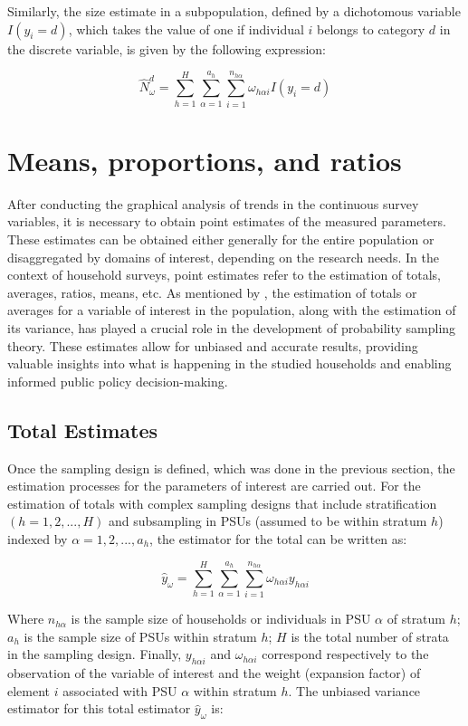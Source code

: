 \documentclass[
  12pt,
]{book}
\begin{document}
Similarly, the size estimate in a subpopulation, defined by a dichotomous variable \(I(y_i = d)\), which takes the value of one if individual \(i\) belongs to category \(d\) in the discrete variable, is given by the following expression:

\[
\hat{N}^d_{\omega} = \sum_{h=1}^{H}\sum_{\alpha=1}^{a_{h}}\sum_{i=1}^{n_{h\alpha}}\omega_{h\alpha i}I(y_i = d)
\]

\hypertarget{means-proportions-and-ratios}{%
\section{Means, proportions, and ratios}\label{means-proportions-and-ratios}}

After conducting the graphical analysis of trends in the continuous survey variables, it is necessary to obtain point estimates of the measured parameters. These estimates can be obtained either generally for the entire population or disaggregated by domains of interest, depending on the research needs. In the context of household surveys, point estimates refer to the estimation of totals, averages, ratios, means, etc. As mentioned by \citet{Heeringa_West_Berglund_2017}, the estimation of totals or averages for a variable of interest in the population, along with the estimation of its variance, has played a crucial role in the development of probability sampling theory. These estimates allow for unbiased and accurate results, providing valuable insights into what is happening in the studied households and enabling informed public policy decision-making.

\hypertarget{total-estimates}{%
\subsection{Total Estimates}\label{total-estimates}}

Once the sampling design is defined, which was done in the previous section, the estimation processes for the parameters of interest are carried out. For the estimation of totals with complex sampling designs that include stratification \(\left(h=1,2,...,H\right)\) and subsampling in PSUs (assumed to be within stratum \(h\)) indexed by \(\alpha=1,2,...,a_{h}\), the estimator for the total can be written as:

\[
\hat{y}_{\omega} = \sum_{h=1}^{H}\sum_{\alpha=1}^{a_{h}}\sum_{i=1}^{n_{h\alpha}}\omega_{h\alpha i}y_{h\alpha i}
\]

Where \(n_{h\alpha}\) is the sample size of households or individuals in PSU \(\alpha\) of stratum \(h\); \(a_{h}\) is the sample size of PSUs within stratum \(h\); \(H\) is the total number of strata in the sampling design. Finally, \(y_{h\alpha i}\) and \(\omega_{h\alpha i}\) correspond respectively to the observation of the variable of interest and the weight (expansion factor) of element \(i\) associated with PSU \(\alpha\) within stratum \(h\). The unbiased variance estimator for this total estimator \(\hat{y}_{\omega}\) is:
\end{document}
